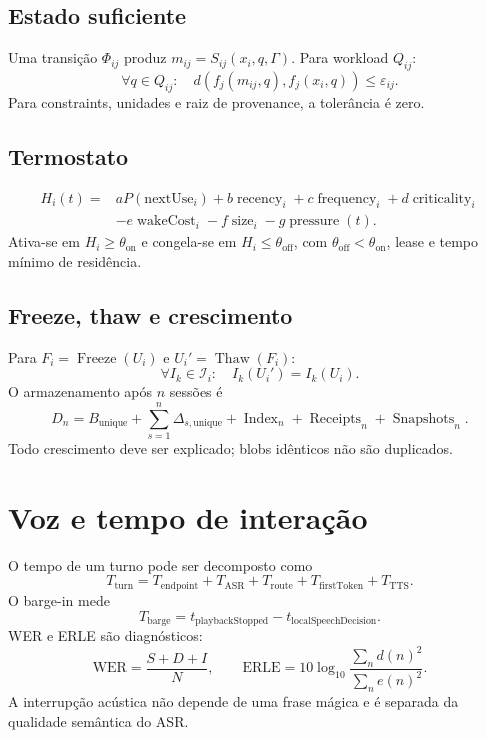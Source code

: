 \documentclass[10pt,a4paper]{article}
\begin{document}
\subsection{Estado suficiente}

Uma transição $\Phi_{ij}$ produz $m_{ij}=S_{ij}(x_i,q,\Gamma)$. Para workload
$Q_{ij}$:
\begin{equation}
\forall q\in Q_{ij}:\quad
d(f_j(m_{ij},q),f_j(x_i,q))\le\varepsilon_{ij}.
\end{equation}
Para constraints, unidades e raiz de provenance, a tolerância é zero.

\subsection{Termostato}

\begin{align}
H_i(t)=&aP(\mathrm{nextUse}_i)+b\operatorname{recency}_i
+c\operatorname{frequency}_i+d\operatorname{criticality}_i\\
&-e\operatorname{wakeCost}_i-f\operatorname{size}_i
-g\operatorname{pressure}(t).
\end{align}
Ativa-se em $H_i\ge\theta_{\mathrm{on}}$ e congela-se em
$H_i\le\theta_{\mathrm{off}}$, com
$\theta_{\mathrm{off}}<\theta_{\mathrm{on}}$, lease e tempo mínimo de
residência.

\subsection{Freeze, thaw e crescimento}

Para $F_i=\operatorname{Freeze}(U_i)$ e
$U_i'=\operatorname{Thaw}(F_i)$:
\begin{equation}
\forall I_k\in\mathcal I_i:\quad I_k(U_i')=I_k(U_i).
\end{equation}
O armazenamento após $n$ sessões é
\begin{equation}
D_n=B_{\mathrm{unique}}+\sum_{s=1}^{n}\Delta_{s,\mathrm{unique}}
+\operatorname{Index}_n+\operatorname{Receipts}_n+\operatorname{Snapshots}_n.
\end{equation}
Todo crescimento deve ser explicado; blobs idênticos não são duplicados.

\section{Voz e tempo de interação}

O tempo de um turno pode ser decomposto como
\begin{equation}
T_{\mathrm{turn}}=T_{\mathrm{endpoint}}+T_{\mathrm{ASR}}
+T_{\mathrm{route}}+T_{\mathrm{firstToken}}+T_{\mathrm{TTS}}.
\end{equation}
O barge-in mede
\begin{equation}
T_{\mathrm{barge}}=t_{\mathrm{playbackStopped}}
-t_{\mathrm{localSpeechDecision}}.
\end{equation}
WER e ERLE são diagnósticos:
\begin{equation}
\mathrm{WER}=\frac{S+D+I}{N},\qquad
\mathrm{ERLE}=10\log_{10}\frac{\sum_nd(n)^2}{\sum_ne(n)^2}.
\end{equation}
A interrupção acústica não depende de uma frase mágica e é separada da qualidade
semântica do ASR.
\end{document}
